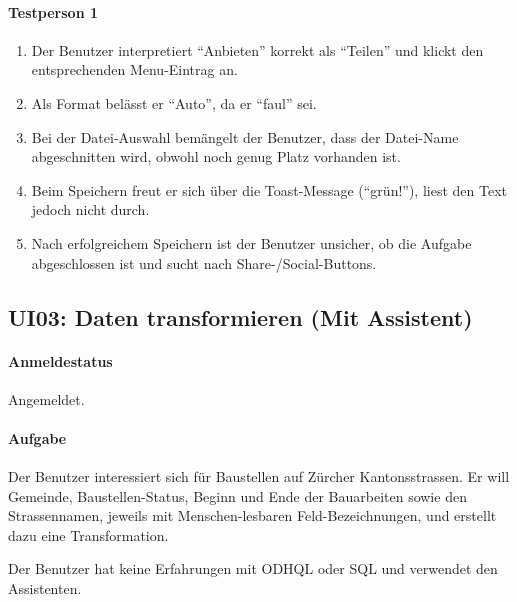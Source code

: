\paragraph{Testperson 1}
\begin{enumerate}
\item Der Benutzer interpretiert ``Anbieten'' korrekt als ``Teilen'' und klickt den entsprechenden Menu-Eintrag an.
\item Als Format belässt er ``Auto'', da er ``faul'' sei.
\item Bei der Datei-Auswahl bemängelt der Benutzer, dass der Datei-Name abgeschnitten wird, obwohl noch genug Platz vorhanden ist.
\item Beim Speichern freut er sich über die Toast-Message (``grün!''), liest den Text jedoch nicht durch.
\item Nach erfolgreichem Speichern ist der Benutzer unsicher, ob die Aufgabe abgeschlossen ist und sucht nach Share-/Social-Buttons.
\end{enumerate}

\subsection{UI03: Daten transformieren (Mit Assistent)}\label{sec:ui-test-trf-ass}
\paragraph{Anmeldestatus} Angemeldet.
\paragraph{Aufgabe} Der Benutzer interessiert sich für Baustellen auf Zürcher Kantonsstrassen. Er will Gemeinde, Baustellen-Status, Beginn und Ende der Bauarbeiten sowie den Strassennamen, jeweils mit Menschen-lesbaren Feld-Bezeichnungen, und erstellt dazu eine Transformation.

Der Benutzer hat keine Erfahrungen mit ODHQL oder SQL und verwendet den Assistenten.

